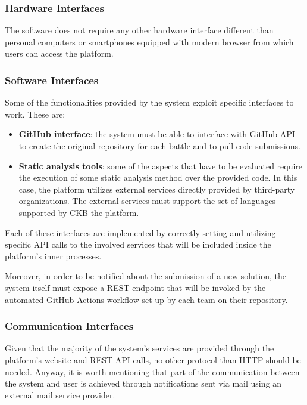 \subsubsection{Hardware Interfaces}
The software does not require any other hardware interface different than personal computers or smartphones equipped with modern browser from which users can access the platform.
\subsubsection{Software Interfaces}
Some of the functionalities provided by the system exploit specific interfaces to work. These are:
\begin{itemize}
    \item \textbf{GitHub interface}: the system must be able to interface with GitHub API to create the original repository for each battle and to pull code submissions.
    \item \textbf{Static analysis tools}: some of the aspects that have to be evaluated require the execution of some static analysis method over the provided code. In this case, the platform utilizes external services directly provided by third-party organizations. The external services must support the set of languages supported by CKB the platform.
\end{itemize}
Each of these interfaces are implemented by correctly setting and utilizing specific API calls to the involved services that will be included inside the platform’s inner processes.

Moreover, in order to be notified about the submission of a new solution, the system itself must expose a REST endpoint that will be invoked by the automated GitHub Actions workflow set up by each team on their repository.
\subsubsection{Communication Interfaces}
Given that the majority of the system's services are provided through the platform's website and REST API calls, no other protocol than HTTP should be needed. Anyway, it is worth mentioning that part of the communication between the system and user is achieved through notifications sent via mail using an external mail service provider.
\newpage


